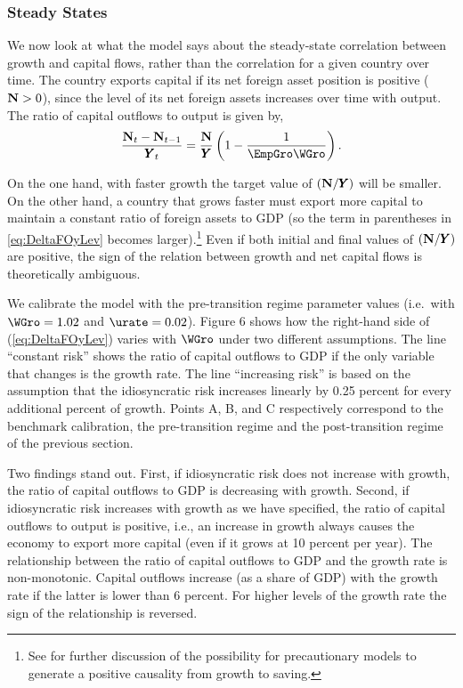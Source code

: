 \documentclass[titlepage]{\econtex}\newcommand{\texname}{cjSOE}
\renewcommand{\GDPLev}{\ensuremath{\pmb{Y}}}
\begin{document}
\subsubsection{Steady States}

We now look at what the model says about the steady-state correlation between growth and capital flows, rather than the correlation for a given country over time. The country exports capital if its net foreign asset position is positive ($\mathbf{N}>0$), since the level of its net foreign assets increases over time with output. The ratio of capital outflows to output is given by,
\begin{equation}
\frac{\NFALev_t-\NFALev_{t-1}}{\GDPLev_t}=\frac{\NFALev}{\GDPLev}\left(1 -\frac{1}{\EmpGro \WGro} \right).
\label{eq:DeltaFOyLev}
\end{equation}

On the one hand, with faster growth the target value of
$(\NFALev/\GDPLev)$ will be smaller.  On the other hand, a country
that grows faster must export more capital to maintain a constant
ratio of foreign assets to GDP (so the term in parentheses in
\eqref{eq:DeltaFOyLev} becomes larger).\footnote{See
  \cite{carroll:RiskyHabits} for further discussion of the possibility
  for precautionary models to generate a positive causality from
  growth to saving.}  Even if both initial and final values of
$(\NFALev/\GDPLev)$ are positive, the sign of the relation between
growth and net capital flows is theoretically ambiguous.

We calibrate the model with the pre-transition regime parameter values
(i.e.\ with $\WGro=1.02$ and $\urate=0.02$). Figure 6 shows how the
right-hand side of (\ref{eq:DeltaFOyLev}) varies with $\WGro$ under
two different assumptions. The line ``constant risk'' shows the ratio
of capital outflows to GDP if the only variable that changes is the
growth rate. The line ``increasing risk'' is based on the assumption
that the idiosyncratic risk increases linearly by 0.25 percent for
every additional percent of growth. Points A, B, and C respectively
correspond to the benchmark calibration, the pre-transition regime and
the post-transition regime of the previous section.

Two findings stand out. First, if idiosyncratic risk does not increase
with growth, the ratio of capital outflows to GDP is decreasing with
growth. Second, if idiosyncratic risk increases with growth as we have
specified, the ratio of capital outflows to output is positive, i.e.,
an increase in growth always causes the economy to export more capital
(even if it grows at 10 percent per year). The relationship between
the ratio of capital outflows to GDP and the growth rate is
non-monotonic. Capital outflows increase (as a share of GDP) with the
growth rate if the latter is lower than 6 percent. For higher levels
of the growth rate the sign of the relationship is reversed.
\end{document}
